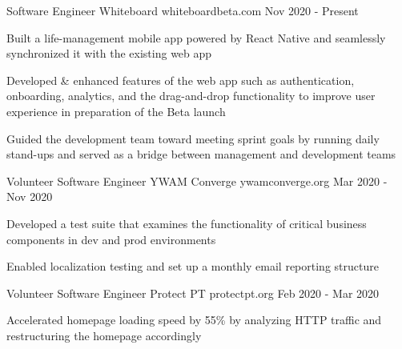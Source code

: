 

\begin{cventries}

\cventry
  {Software Engineer} %
  {Whiteboard} %
  {whiteboardbeta.com} %
  {Nov 2020 - Present} %
  {
    \begin{cvitems} %
      \item {Built a life-management mobile app powered by React Native and seamlessly synchronized it with the existing web app}
      \item {Developed \& enhanced features of the web app such as authentication, onboarding, analytics, and the drag-and-drop functionality to improve user experience in preparation of the Beta launch}
      \item {Guided the development team toward meeting sprint goals by running daily stand-ups and served as a bridge between management and development teams}
    \end{cvitems}
  }

\cventry
  {Volunteer Software Engineer} %
  {YWAM Converge} %
  {ywamconverge.org} %
  {Mar 2020 - Nov 2020} %
  {
    \begin{cvitems} %
      \item {Developed a test suite that examines the functionality of critical business components in dev and prod environments}
      \item {Enabled localization testing and set up a monthly email reporting structure}
    \end{cvitems}
  }

\cventry
  {Volunteer Software Engineer} %
  {Protect PT} %
  {protectpt.org} %
  {Feb 2020 - Mar 2020} %
  {
    \begin{cvitems} %
      \item {Accelerated homepage loading speed by 55\% by analyzing HTTP traffic and restructuring the homepage accordingly}
    \end{cvitems}
  }


\end{cventries}
